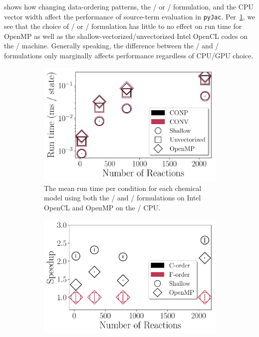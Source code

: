 \documentclass[12pt,number,sort&compress,preprint]{elsarticle}
\begin{document}
 shows how changing data-ordering patterns, the \conp/ or \conv/ formulation, and the CPU vector width affect the performance of source-term evaluation in \texttt{pyJac}.
Per~\cref{F:source_conpvsconv}, we see that the choice of \conp/ or \conv/ formulation has little to no effect on run time for OpenMP as well as the shallow-vectorized\slash unvectorized Intel OpenCL codes on the \avx/ machine.
Generally speaking, the difference between the \conp/ and \conv/ formulations only marginally affects performance regardless of CPU\slash GPU choice.

\begin{figure}[htbp]
   \centering
  \begin{subfigure}[t]{0.48\linewidth}
      \includegraphics[width=\textwidth]{source_conpvsconv.pdf}
      \caption{The mean run time per condition for each chemical model using both the \conp/ and \conv/ formulations on Intel OpenCL and OpenMP on the \avx/ CPU.}
      \label{F:source_conpvsconv}
  \end{subfigure}
  \hfill
  \begin{subfigure}[t]{0.48\linewidth}
      \includegraphics[width=\textwidth]{source_cvsf.pdf}

\end{subfigure}
\end{figure}
\end{document}

